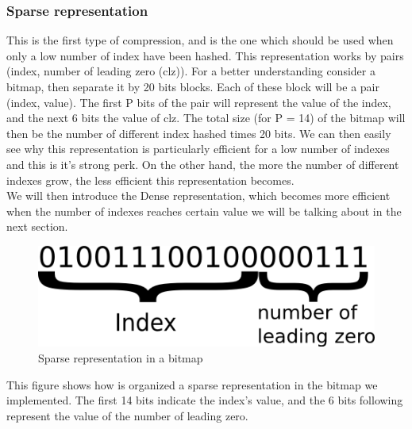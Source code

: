 \documentclass{article}
\begin{document}
\subsubsection{Sparse representation}
This is the first type of compression, and is the one which should be used when only a low number
of index have been hashed. This representation works by pairs (index, number of leading zero (clz)).
For a  better understanding consider a bitmap, then separate it by 20 bits blocks. Each of these block will be 
a pair (index, value). The first P bits of the pair will represent the value of the index, and the next 6 bits 
the value of clz. The total size (for P = 14) of the bitmap will then be the number of different index hashed
times 20 bits. We can then easily see why this representation is particularly efficient for a low number of 
indexes and this is it's strong perk. On the other hand, the more the number of different indexes grow, the less 
efficient this representation becomes. \\ 
We will then introduce the Dense representation, which becomes more efficient when the number of indexes reaches certain value we will be talking about in the next section. \\

\begin{center}
\begin{figure}[h]
\includegraphics[scale=0.5]{sparse.png}
\caption{Sparse representation in a bitmap}
\end{figure}
\end{center}

This figure shows how is organized a sparse representation in the bitmap we implemented. 
The first 14 bits indicate the index's value, and the 6 bits following represent the
value of the number of leading zero.
\end{document}
